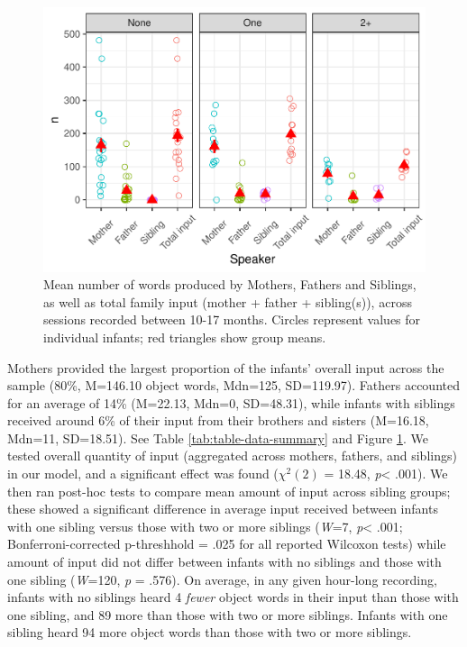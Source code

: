 \documentclass[
  english,
  man,floatsintext]{apa6}
\begin{document}
\begin{figure}
\centering
\includegraphics{SiblingsStudyText_files/figure-latex/Figure-Speaker-count-1.pdf}
\caption{\label{fig:Figure-Speaker-count}Mean number of words produced by Mothers, Fathers and Siblings, as well as total family input (mother + father + sibling(s)), across sessions recorded between 10-17 months. Circles represent values for individual infants; red triangles show group means.}
\end{figure}

Mothers provided the largest proportion of the infants' overall input across the sample (80\%, M=146.10 object words, Mdn=125, SD=119.97). Fathers accounted for an average of 14\% (M=22.13, Mdn=0, SD=48.31), while infants with siblings received around 6\% of their input from their brothers and sisters (M=16.18, Mdn=11, SD=18.51). See Table \ref{tab:table-data-summary} and Figure \ref{fig:Figure-Speaker-count}. We tested overall quantity of input (aggregated across mothers, fathers, and siblings) in our model, and a significant effect was found (\(\chi^2 (2)\) = 18.48, \emph{p}\textless{} .001). We then ran post-hoc tests to compare mean amount of input across sibling groups; these showed a significant difference in average input received between infants with one sibling versus those with two
or more siblings (\emph{W}=7, \emph{p}\textless{} .001; Bonferroni-corrected p-threshhold = .025 for all reported Wilcoxon tests) while amount of input did not differ between infants with no siblings and those with one sibling (\emph{W}=120, \emph{p} = .576). On average, in any given hour-long recording, infants with no siblings heard 4 \emph{fewer} object words in their input than those with one sibling, and 89 more than those with two or more siblings. Infants with one sibling heard 94 more object words than those with two or more siblings.
\end{document}
